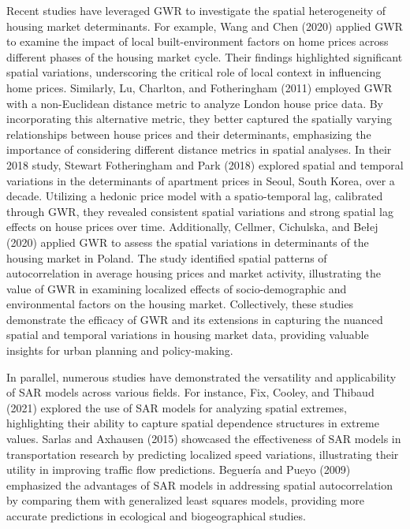 \documentclass[
  default,
]{sn-jnl}
\begin{document}
Recent studies have leveraged GWR to investigate the spatial
heterogeneity of housing market determinants. For example, Wang and Chen
(2020) applied GWR to examine the impact of local built-environment
factors on home prices across different phases of the housing market
cycle. Their findings highlighted significant spatial variations,
underscoring the critical role of local context in influencing home
prices. Similarly, Lu, Charlton, and Fotheringham (2011) employed GWR
with a non-Euclidean distance metric to analyze London house price data.
By incorporating this alternative metric, they better captured the
spatially varying relationships between house prices and their
determinants, emphasizing the importance of considering different
distance metrics in spatial analyses. In their 2018 study, Stewart
Fotheringham and Park (2018) explored spatial and temporal variations in
the determinants of apartment prices in Seoul, South Korea, over a
decade. Utilizing a hedonic price model with a spatio-temporal lag,
calibrated through GWR, they revealed consistent spatial variations and
strong spatial lag effects on house prices over time. Additionally,
Cellmer, Cichulska, and Bełej (2020) applied GWR to assess the spatial
variations in determinants of the housing market in Poland. The study
identified spatial patterns of autocorrelation in average housing prices
and market activity, illustrating the value of GWR in examining
localized effects of socio-demographic and environmental factors on the
housing market. Collectively, these studies demonstrate the efficacy of
GWR and its extensions in capturing the nuanced spatial and temporal
variations in housing market data, providing valuable insights for urban
planning and policy-making.

In parallel, numerous studies have demonstrated the versatility and
applicability of SAR models across various fields. For instance, Fix,
Cooley, and Thibaud (2021) explored the use of SAR models for analyzing
spatial extremes, highlighting their ability to capture spatial
dependence structures in extreme values. Sarlas and Axhausen (2015)
showcased the effectiveness of SAR models in transportation research by
predicting localized speed variations, illustrating their utility in
improving traffic flow predictions. Beguería and Pueyo (2009) emphasized
the advantages of SAR models in addressing spatial autocorrelation by
comparing them with generalized least squares models, providing more
accurate predictions in ecological and biogeographical studies.
\end{document}
